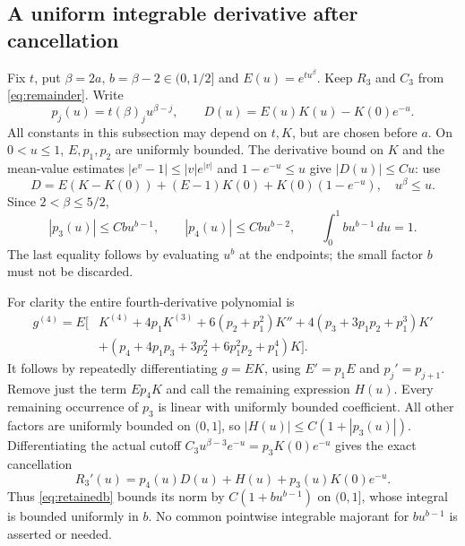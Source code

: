 \documentclass[11pt]{article}
\theoremstyle{remark}\newtheorem{remark}[theorem]{Remark}
\begin{document}
\subsection*{A uniform integrable derivative after cancellation}
Fix $t$, put $\beta=2a$, $b=\beta-2\in(0,1/2]$ and
$E(u)=e^{tu^\beta}$. Keep $R_3$ and $C_3$ from
\eqref{eq:remainder}. Write
\[
 p_j(u)=t(\beta)_j u^{\beta-j},\qquad
 D(u)=E(u)K(u)-K(0)e^{-u}.
\]
All constants in this subsection may depend on $t,K$, but are
chosen before $a$. On $0<u\leq1$, $E,p_1,p_2$ are uniformly
bounded. The derivative bound on $K$ and the mean-value estimates
$|e^v-1|\leq |v|e^{|v|}$ and $1-e^{-u}\leq u$ give
$|D(u)|\leq C u$: use
\[
 D=E(K-K(0))+(E-1)K(0)+K(0)(1-e^{-u}),\quad
 u^\beta\leq u.
\]
Since $2<\beta\leq5/2$,
\begin{equation}\label{eq:retainedb}
 |p_3(u)|\leq Cb u^{b-1},\qquad
 |p_4(u)|\leq Cb u^{b-2},\qquad
 \int_0^1 b u^{b-1}\,du=1.
\end{equation}
The last equality follows by evaluating $u^b$ at the endpoints;
the small factor $b$ must not be discarded.

For clarity the entire fourth-derivative polynomial is
\begin{align*}
 g^{(4)}=E\bigl[&K^{(4)}+4p_1K^{(3)}+6(p_2+p_1^2)K''
       +4(p_3+3p_1p_2+p_1^3)K'\\
       &+(p_4+4p_1p_3+3p_2^2+6p_1^2p_2+p_1^4)K\bigr].
\end{align*}
It follows by repeatedly differentiating $g=EK$, using $E'=p_1E$
and $p_j'=p_{j+1}$. Remove just the term $Ep_4K$ and call
the remaining expression $H(u)$. Every remaining occurrence of
$p_3$ is linear with uniformly bounded coefficient. All other
factors are uniformly bounded on $(0,1]$, so
$|H(u)|\leq C(1+|p_3(u)|)$. Differentiating the actual cutoff
$C_3u^{\beta-3}e^{-u}=p_3K(0)e^{-u}$ gives the exact cancellation
\[
 R_3'(u)=p_4(u)D(u)+H(u)+p_3(u)K(0)e^{-u}.
\]
Thus \eqref{eq:retainedb} bounds its norm by
$C(1+b u^{b-1})$ on $(0,1]$, whose integral is bounded uniformly
in $b$. No common pointwise integrable majorant for
$b u^{b-1}$ is asserted or needed.
\end{document}
